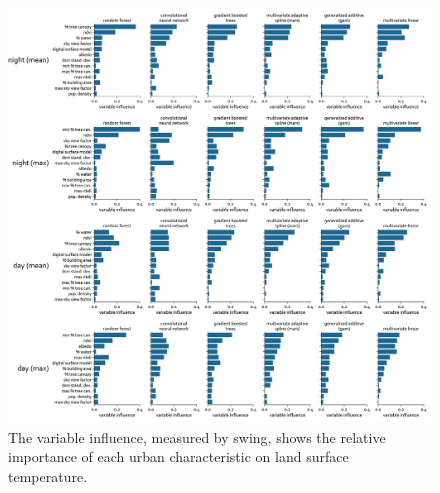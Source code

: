 \documentclass[final,3p,times,twocolumn,sort&compress]{elsarticle}
\begin{document}
\begin{figure}
    \begin{center}
    \includegraphics[width=\linewidth]{fig/report/importance_500.png}
    \caption[Variable influence on LST at 500 meter resolution]{
    The variable influence, measured by swing, shows the relative importance of each urban characteristic on land surface temperature.}
    \label{fig:importance_500}
    \end{center}
\end{figure}
\end{document}
